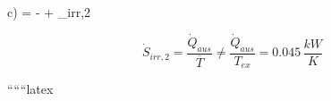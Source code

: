 c)  =  -  + _{irr,2}

\[
\dot{S}_{irr,2} = \frac{\dot{Q}_{aus}}{\overline{T}} \neq \frac{\dot{Q}_{aus}}{T_{ex}} = 0.045 \, \frac{kW}{K}
\]

``````latex